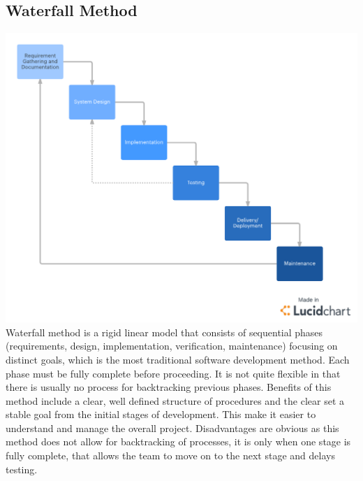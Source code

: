 \documentclass[a4paper]{article}
\begin{document}
{\subsection{Waterfall Method}
\includegraphics[scale=0.3]{waterfall.png}
\autocite{D02}
\bigbreak
Waterfall method is a rigid linear model that consists of sequential phases (requirements, design, implementation, verification, maintenance) focusing on distinct goals, which is the most traditional software development method. Each phase must be fully complete before proceeding. It is not quite flexible in that there is usually no process for backtracking previous phases.
\bigbreak
Benefits of this method include a clear, well defined structure of procedures and the clear set a stable goal from the initial stages of development. This make it easier to understand and manage the overall project.
\bigbreak
Disadvantages are obvious as this method does not allow for backtracking of processes, it is only when one stage is fully complete, that allows the team to move on to the next stage and delays testing.
\bigbreak

}
\end{document}
